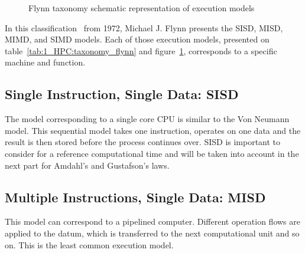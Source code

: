 \begin{table}
\centering
{}
\caption{Flynn taxonomy for execution models completed with SPMD and SIMT models}
\label{tab:1_HPC:taxonomy_flynn}
\end{table}

\begin{figure}

\caption{Flynn taxonomy schematic representation of execution models}
\label{fig:1_HPC:flynn_taxonomy}
\end{figure}

In this classification~\cite{flynn1972some} from 1972, Michael J. Flynn presents the SISD, MISD, MIMD, and SIMD models.
Each of those execution models, presented on table~\ref{tab:1_HPC:taxonomy_flynn} and figure~\ref{fig:1_HPC:flynn_taxonomy}, corresponds to a specific machine and function.

\subsection{Single Instruction, Single Data: SISD}
The model corresponding to a single core CPU is similar to the Von Neumann model. 
This sequential model takes one instruction, operates on one data and the result is then stored before the process continues over. 
SISD is important to consider for a reference computational time and will be taken into account in the next part for Amdahl's and Gustafson's laws.

\subsection{Multiple Instructions, Single Data: MISD}
This model can correspond to a pipelined computer.
Different operation flows are applied to the datum, which is transferred to the next computational unit and so on. 
This is the least common execution model.


